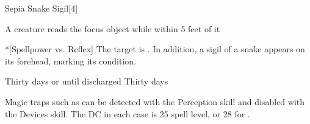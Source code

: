 \begin{spellsection}{Sepia Snake Sigil}[4]
    \begin{spellheader}
    \end{spellheader}
    \begin{spellcontent}
        \begin{spelltargetinginfo}
        \end{spelltargetinginfo}
        \begin{spelleffects}
            \begin{spelltrigger}{A creature reads the focus object while within 5 feet of it}
                \begin{spelltarget}*[Spellpower vs. Reflex]
                    \spellsuccess The target is \slowed. In addition, a sigil of a snake appears on its forehead, marking its condition.
                \end{spelltarget}
            \end{spelltrigger}
            \spelldur Thirty days or until discharged
            \spelldur Thirty days
        \end{spelleffects}
    \end{spellcontent}
    \begin{spellfooter}
        \spellnotes Magic traps such as  can be detected with the Perception skill and disabled with the Devices skill. The DC in each case is 25 \add spell level, or 28 for .
    \end{spellfooter}
\end{spellsection}

